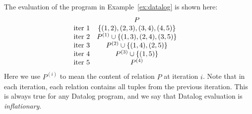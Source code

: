 \begin{ex}
\label{ex:tc-fixpoint}
The evaluation of the program in Example~\ref{ex:datalog} is shown here:
%
\begin{align*}
    &
    \begin{array}{l c } 
                       & P \\ 
        \text{iter } 1 & \{(1, 2), (2, 3), (3, 4), (4, 5)\} \\ 
        \text{iter } 2 & P^{(1)} \cup \{ (1, 3), (2, 4), (3, 5)\} \\
        \text{iter } 3 & P^{(2)} \cup \{ (1, 4), (2, 5) \} \\
        \text{iter } 4 & P^{(3)} \cup \{ (1, 5) \} \\
        \text{iter } 5 & P^{(4)} \\
    \end{array}
\end{align*}
%
Here we use $P^{(i)}$ to mean the content of relation $P$ at iteration $i$.
Note that in each iteration, each relation contains all tuples from the previous iteration.
This is always true for any Datalog program, 
 and we say that Datalog evaluation is {\em inflationary}.
\end{ex}


